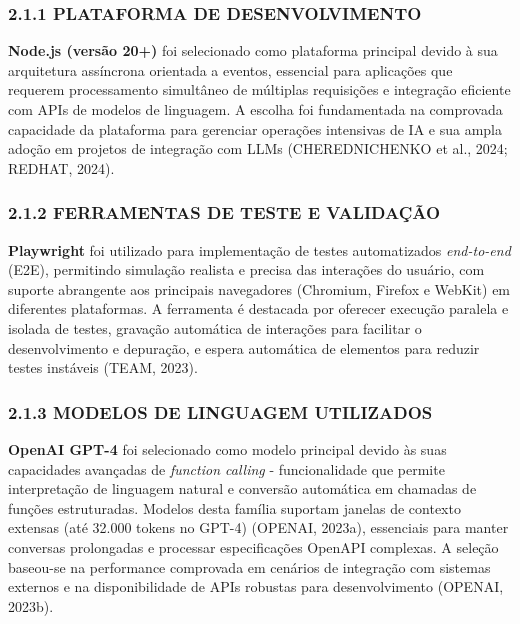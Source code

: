 \documentclass[
]{article}
\begin{document}
\subsubsection{2.1.1 PLATAFORMA DE
DESENVOLVIMENTO}\label{plataforma-de-desenvolvimento}

\textbf{Node.js (versão 20+)} foi selecionado como plataforma principal
devido à sua arquitetura assíncrona orientada a eventos, essencial para
aplicações que requerem processamento simultâneo de múltiplas
requisições e integração eficiente com APIs de modelos de linguagem. A
escolha foi fundamentada na comprovada capacidade da plataforma para
gerenciar operações intensivas de IA e sua ampla adoção em projetos de
integração com LLMs (CHEREDNICHENKO et al., 2024; REDHAT, 2024).

\subsubsection{2.1.2 FERRAMENTAS DE TESTE E
VALIDAÇÃO}\label{ferramentas-de-teste-e-validauxe7uxe3o}

\textbf{Playwright} foi utilizado para implementação de testes
automatizados \emph{end-to-end} (E2E), permitindo simulação realista e
precisa das interações do usuário, com suporte abrangente aos principais
navegadores (Chromium, Firefox e WebKit) em diferentes plataformas. A
ferramenta é destacada por oferecer execução paralela e isolada de
testes, gravação automática de interações para facilitar o
desenvolvimento e depuração, e espera automática de elementos para
reduzir testes instáveis (TEAM, 2023).

\subsubsection{2.1.3 MODELOS DE LINGUAGEM
UTILIZADOS}\label{modelos-de-linguagem-utilizados}

\textbf{OpenAI GPT-4} foi selecionado como modelo principal devido às
suas capacidades avançadas de \emph{function calling} - funcionalidade
que permite interpretação de linguagem natural e conversão automática em
chamadas de funções estruturadas. Modelos desta família suportam janelas
de contexto extensas (até 32.000 tokens no GPT-4) (OPENAI, 2023a),
essenciais para manter conversas prolongadas e processar especificações
OpenAPI complexas. A seleção baseou-se na performance comprovada em
cenários de integração com sistemas externos e na disponibilidade de
APIs robustas para desenvolvimento (OPENAI, 2023b).
\end{document}
